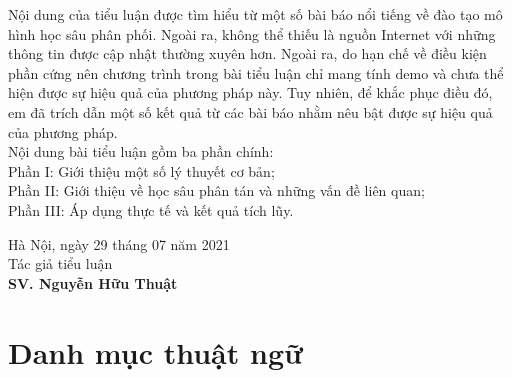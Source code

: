 \documentclass[11pt,a4paper]{article}
\numberwithin{equation}{subsection}
\numberwithin{figure}{subsection}
\numberwithin{table}{subsection}
\begin{document}
Nội dung của tiểu luận được tìm hiểu từ một số bài báo nổi tiếng về đào tạo mô hình học sâu phân phối. Ngoài ra, không thể thiếu là nguồn Internet với những thông tin được cập nhật thường xuyên hơn. Ngoài ra, do hạn chế về điều kiện phần cứng nên chương trình trong bài tiểu luận chỉ mang tính demo và chưa thể hiện được sự hiệu quả của phương pháp này. Tuy nhiên, để khắc phục điều đó, em đã trích dẫn một số kết quả từ các bài báo nhằm nêu bật được sự hiệu quả của phương pháp.\\

Nội dung bài tiểu luận gồm ba phần chính:\\[0.2 cm]
Phần I: Giới thiệu một số lý thuyết cơ bản;\\[0.2 cm]
Phần II: Giới thiệu về học sâu phân tán và những vấn đề liên quan; \\[0.2 cm]
Phần III: Áp dụng thực tế và kết quả tích lũy. \\[1 cm]
 \begin{flushright}
\qquad  Hà Nội, ngày 29 tháng 07 năm 2021 \hspace{0.1 cm} \\[0.5 cm]
Tác giả tiểu luận \hspace*{2 cm}  \\[3 cm]
\textbf{SV. Nguyễn Hữu Thuật} \hspace*{0.5 cm}
 \end{flushright}

\newpage
\tableofcontents
\newpage
\section*{Danh mục thuật ngữ}
\end{document}
